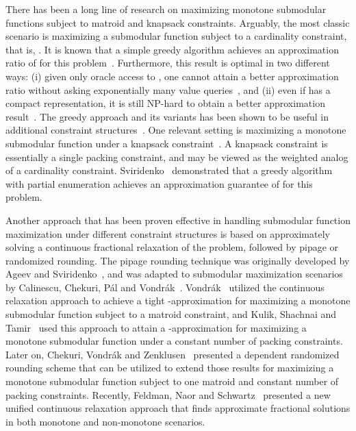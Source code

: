 \documentclass[11pt]{article}
\theoremstyle{plain}
\theoremstyle{definition}
\begin{document}
There has been a long line of research on maximizing monotone
submodular functions subject to matroid and knapsack constraints.
Arguably, the most classic scenario is maximizing a submodular
function subject to a cardinality constraint, that is, . It is known that a simple greedy algorithm
achieves an approximation ratio of  for this
problem~\cite{NemhauserWF78}. Furthermore, this result is optimal
in two different ways: (i) given only oracle access to , one
cannot attain a better approximation ratio without asking
exponentially many value queries~\cite{NemhauserW78}, and (ii)
even if  has a compact representation, it is still NP-hard to
obtain a better approximation result~\cite{Feige98}. The greedy
approach and its variants has been shown to be useful in
additional constraint
structures~\cite{FisherNW78,KhullerMN99,ChekuriK04,GoundanS07}.
One relevant setting is maximizing a monotone submodular function
under a knapsack constraint~\cite{Wolsey82a}. A knapsack
constraint is essentially a single packing constraint, and may be
viewed as the weighted analog of a cardinality constraint.
Sviridenko~\cite{Sviridenko04} demonstrated that a greedy
algorithm with partial enumeration achieves an approximation
guarantee of  for this problem.

Another approach that has been proven effective in handling
submodular function maximization under different constraint
structures is based on approximately solving a continuous
fractional relaxation of the problem, followed by pipage or
randomized rounding. The pipage rounding technique was originally
developed by Ageev and Sviridenko~\cite{AgeevS04}, and was adapted
to submodular maximization scenarios by Calinescu, Chekuri,
P{\'a}l and Vondr{\'a}k~\cite{CalinescuCPV07}.
Vondr{\'a}k~\cite{Vondrak08} utilized the continuous relaxation
approach to achieve a tight -approximation for
maximizing a monotone submodular function subject to a matroid
constraint, and Kulik, Shachnai and Tamir~\cite{KulikST09} used
this approach to attain a -approximation
for maximizing a monotone submodular function under a constant
number of packing constraints. Later on, Chekuri, Vondr{\'a}k and
Zenklusen~\cite{ChekuriVZ10} presented a dependent randomized
rounding scheme that can be utilized to extend those results for
maximizing a monotone submodular function subject to one matroid
and constant number of packing constraints. Recently, Feldman,
Naor and Schwartz~\cite{FeldmanNS11a} presented a new unified
continuous relaxation approach that finds approximate fractional
solutions in both monotone and non-monotone scenarios.
\end{document}
